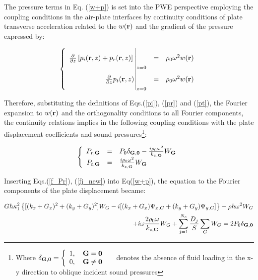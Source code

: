 \documentclass[a4paper]{ICEDyn}
\begin{document}
	The pressure terms in Eq. (\ref{w+p}) is set into the PWE perspective employing the coupling conditions in the air-plate interfaces by continuity conditions of plate transverse acceleration related to the $w({\bf r})$ and the gradient of the pressure expressed by:
	
	\begin{equation}
    \left \{
	\begin{array}{r c l}
	\frac{\partial}{\partial z}\left[ p_{i}({\bf r},z)+ p_{r}({\bf r},z)\right]\Bigg|_{z=0} &=& \rho_{0}\omega^{2}w({\bf r})\\
%
\frac{\partial}{\partial z}p_{t}({\bf r},z) \Bigg|_{z=0} &=& \rho_{0}\omega^{2}w({\bf r})
	\end{array}
    \right .
	\end{equation}
    
Therefore, substituting the definitions of Eqs.(\ref{pi}), (\ref{pr}) and (\ref{pt}), the Fourier expansion to $w({\bf r})$ and the orthogonality conditions to all Fourier components, the continuity relations implies in the following coupling conditions with the plate displacement coefficients and sound pressures\footnote{Where $\delta_{\bf{G},\bf{0}} = 
	\left\lbrace
	\begin{array}{c l}
	1,\quad  {\bf G = 0}    &\\
	0,\quad  {\bf G \neq 0} &
	\end{array}
	\right .
	$ denotes the absence of fluid loading in the x-y direction to oblique incident sound pressures}:

	\begin{equation}\label{coupwithp}
    \left \{
	\begin{array}{rcl}
    P_{r,{\bf G}} &=& P_{0}\delta_{{\bf G},{\bf 0}}-\frac{i\rho_{0}\omega^{2}}{k_{z,{\bf G}}}W_{{\bf G}}\label{f_Pr}\\
	P_{t,{\bf G}} &=&{\frac{i\rho_{0}\omega^{2}}{k_{z,{\bf G}}}W_{{\bf G}}}\label{f_Pt}
    \end{array}
    \right .
	\end{equation}
	
	Inserting Eqs.(\ref{f_Pr}), (\ref{fj_new}) into Eq(\ref{w+p}), the equation to the Fourier components of the plate displacement became:
	
	\begin{eqnarray}
	\label{stl_w}
	Gh\kappa_{1}^{2}\left\{[(k_x + G_x)^2+(k_y + G_y)^2]W_{G} - i[(k_x + G_x)\Psi_{x,G} + (k_y + G_y)\Psi_{y,G}] \right\}-\rho h\omega^2W_{G}
    \nonumber \\
 +i\omega \frac{2\rho_0\omega}{k_{z,{\bf G}}}W_{G} + \sum_{j=1}^{N_o}\frac{D_j}{S} \sum_{{ G}} {W_G}  = 2P_0 \delta_{{\bf G},{\bf 0}} 
	\end{eqnarray}
\end{document}
